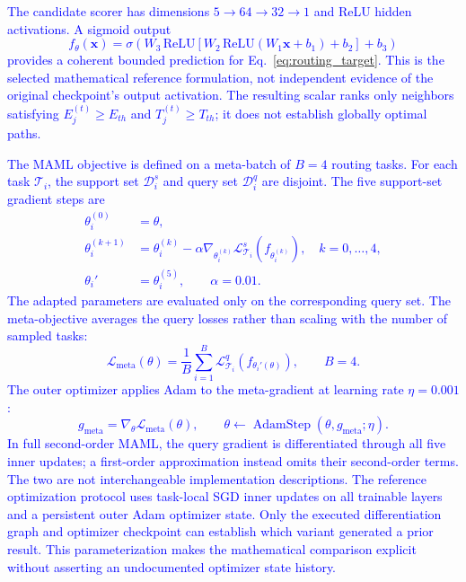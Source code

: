 \documentclass[pdflatex,sn-mathphys-num]{sn-jnl}
\newcommand{\Revised}[1]{\textcolor{blue}{#1}}
\begin{document}
\Revised{The candidate scorer has dimensions $5\!\rightarrow\!64\!\rightarrow\!32\!\rightarrow\!1$ and ReLU hidden activations. A sigmoid output
\begin{equation}
 f_\theta(\mathbf x)=\sigma\!\left(W_3\,\mathrm{ReLU}\left[W_2\,\mathrm{ReLU}(W_1\mathbf x+b_1)+b_2\right]+b_3\right)
 \label{eq:score_net_final}
\end{equation}
provides a coherent bounded prediction for Eq.~\eqref{eq:routing_target}. This is the selected mathematical reference formulation, not independent evidence of the original checkpoint's output activation. The resulting scalar ranks only neighbors satisfying $E_j^{(t)}\ge E_{th}$ and $T_j^{(t)}\ge T_{th}$; it does not establish globally optimal paths.}\par

\Revised{The MAML objective is defined on a meta-batch of $B=4$ routing tasks. For each task $\mathcal T_i$, the support set $\mathcal D_i^s$ and query set $\mathcal D_i^q$ are disjoint. The five support-set gradient steps are
\begin{align}
 \theta_i^{(0)}&=\theta,\\
 \theta_i^{(k+1)}&=\theta_i^{(k)}-\alpha\nabla_{\theta_i^{(k)}}\mathcal L_{\mathcal T_i}^{s}(f_{\theta_i^{(k)}}),\quad k=0,\dots,4,\\
 \theta_i'&=\theta_i^{(5)},\qquad \alpha=0.01.
\end{align}
The adapted parameters are evaluated only on the corresponding query set. The meta-objective averages the query losses rather than scaling with the number of sampled tasks:
\begin{equation}
 \mathcal L_{\mathrm{meta}}(\theta)=\frac{1}{B}\sum_{i=1}^{B}\mathcal L_{\mathcal T_i}^{q}(f_{\theta_i'(\theta)}),\qquad B=4.\label{eq:meta_r2}
\end{equation}
The outer optimizer applies Adam to the meta-gradient at learning rate $\eta=0.001$:
\begin{equation}
 g_{\mathrm{meta}}=\nabla_\theta\mathcal L_{\mathrm{meta}}(\theta),\qquad
 \theta\leftarrow\operatorname{AdamStep}(\theta,g_{\mathrm{meta}};\eta).
 \label{eq:adam_r2}
\end{equation}
In full second-order MAML, the query gradient is differentiated through all five inner updates; a first-order approximation instead omits their second-order terms. The two are not interchangeable implementation descriptions. The reference optimization protocol uses task-local SGD inner updates on all trainable layers and a persistent outer Adam optimizer state. Only the executed differentiation graph and optimizer checkpoint can establish which variant generated a prior result. This parameterization makes the mathematical comparison explicit without asserting an undocumented optimizer state history.}
\end{document}
